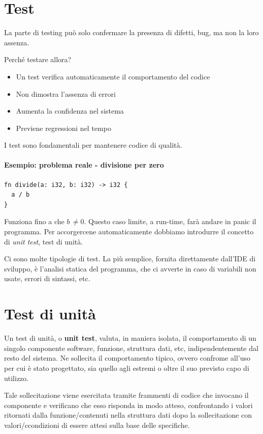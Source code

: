 \section{Test}

La parte di testing può solo confermare la presenza di difetti, bug, ma non la loro assenza.

Perché testare allora?
\begin{itemize}
  \item Un test verifica automaticamente il comportamento del codice
  \item Non dimostra l'assenza di errori
  \item Aumenta la confidenza nel sistema
  \item Previene regressioni nel tempo
\end{itemize}

I test sono fondamentali per mantenere codice di qualità.

\paragraph{Esempio: problema reale - divisione per zero}

\begin{verbatim}
fn divide(a: i32, b: i32) -> i32 {
  a / b
}
\end{verbatim}

Funziona fino a che $b\,\neq 0$. Questo caso limite, a run-time, farà andare in panic il programma.
Per accorgercene automaticamente dobbiamo introdurre il concetto di \textit{unit test}, test di unità.

Ci sono molte tipologie di test. La più semplice, fornita direttamente dall'IDE di sviluppo,
è l'analisi statica del programma, che ci avverte in caso di variabili non usate, errori di sintassi, etc.

\section{Test di unità}

Un test di unità, o \textbf{unit test}, valuta, in maniera isolata, il comportamento di un singolo
componente software, funzione, struttura dati, etc, indipendentemente dal resto
del sistema. Ne sollecita il comportamento tipico, ovvero confrome all'uso per
cui è stato progettato, sia quello agli estremi o oltre il suo previsto capo di
utilizzo.

Tale sollecitazione viene esercitata tramite frammenti di codice che invocano il
componente e verificano che esso risponda in modo atteso, confrontando i
valori ritornati dalla funzione/contenuti nella struttura dati dopo la sollecitazione
con valori/ccondizioni di essere attesi sulla base delle specifiche.


